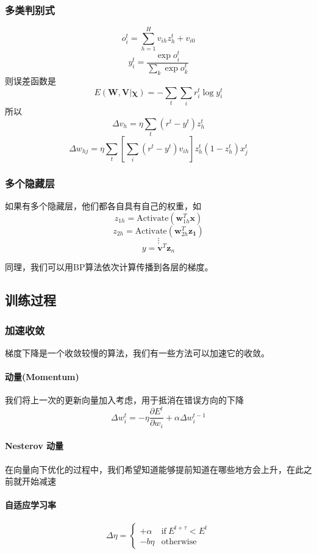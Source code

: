 \documentclass[11pt]{article}
\begin{document}
    			\subsubsection{多类判别式}
    				\[o_i^t = \sum_{h = 1}^H v_{ih}z_{h}^t + v_{i0}\]
    				\[y^t_i = \frac{\exp o_i^t}{\sum_k \exp o_k^t}\]
    				则误差函数是
    				\[E(\mathbf{W, V | \chi}) = - \sum_t \sum_i r^t_i \log y^t_i\]
    				所以
    				\[\Delta v_h = \eta \sum_t (r^t - y^t)z_h^t\]
    				\[\Delta w_{hj} = \eta \sum_t \left[\sum_i (r^t - y^t)v_{ih}\right]z_h^t(1 - z_h^t)x_j^t\]
    			\subsubsection{多个隐藏层}
    				如果有多个隐藏层，他们都各自具有自己的权重，如
    				\[z_{1h} = \mathrm{Activate}(\mathbf{w}_{1h}^T\mathbf{x})\]
    				\[z_{2h} = \mathrm{Activate}(\mathbf{w}_{2h}^T\mathbf{z_1})\]
    				\[\vdots\]
    				\[y = \mathbf{v}^T\mathbf{z}_n\]
    				
    				同理，我们可以用BP算法依次计算传播到各层的梯度。
    		\subsection{训练过程}
    			\subsubsection{加速收敛}
    				梯度下降是一个收敛较慢的算法，我们有一些方法可以加速它的收敛。
    				\paragraph{动量(Momentum)}
    					我们将上一次的更新向量加入考虑，用于抵消在错误方向的下降
    					\[\Delta w_i^t = - \eta \frac{\partial E^t}{\partial w_i} + \alpha\Delta w_i^{t - 1}\]
    				\paragraph{Nesterov 动量}
    					在向量向下优化的过程中，我们希望知道能够提前知道在哪些地方会上升，在此之前就开始减速
    				\paragraph{自适应学习率}
    					\[\Delta \eta = \left\{\begin{array}{ll}
    						+ \alpha & \mathrm{if\ }E^{t + \tau} < E^t\\
    						-b \eta & \mathrm{otherwise}
    					\end{array} \right.\]
\end{document}
